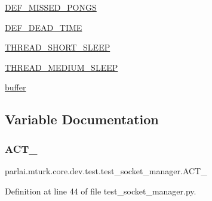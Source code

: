 \begin{DoxyCompactItemize}
\item 
\hyperlink{namespaceparlai_1_1mturk_1_1core_1_1dev_1_1test_1_1test__socket__manager_a581a61136610cac13da7eb93088bada4}{D\+E\+F\+\_\+\+M\+I\+S\+S\+E\+D\+\_\+\+P\+O\+N\+GS}
\item 
\hyperlink{namespaceparlai_1_1mturk_1_1core_1_1dev_1_1test_1_1test__socket__manager_a1f526f53b9ea429b7239abfe36761276}{D\+E\+F\+\_\+\+D\+E\+A\+D\+\_\+\+T\+I\+ME}
\item 
\hyperlink{namespaceparlai_1_1mturk_1_1core_1_1dev_1_1test_1_1test__socket__manager_ab474ca67f53fba2be6497594a4a0153e}{T\+H\+R\+E\+A\+D\+\_\+\+S\+H\+O\+R\+T\+\_\+\+S\+L\+E\+EP}
\item 
\hyperlink{namespaceparlai_1_1mturk_1_1core_1_1dev_1_1test_1_1test__socket__manager_afa35654edb0cffd647d87571a5de1264}{T\+H\+R\+E\+A\+D\+\_\+\+M\+E\+D\+I\+U\+M\+\_\+\+S\+L\+E\+EP}
\item 
\hyperlink{namespaceparlai_1_1mturk_1_1core_1_1dev_1_1test_1_1test__socket__manager_a32a19c42d26fb7242ba0cc3bc351efec}{buffer}
\end{DoxyCompactItemize}


\subsection{Variable Documentation}
\mbox{\label{namespaceparlai_1_1mturk_1_1core_1_1dev_1_1test_1_1test__socket__manager_a4bb06fcd05896bc65302255ed50b28ff}} 
\subsubsection{\texorpdfstring{A\+C\+T\+\_}{ACT\_1}}
{\footnotesize\ttfamily parlai.\+mturk.\+core.\+dev.\+test.\+test\+\_\+socket\+\_\+manager.\+A\+C\+T\+\_}



Definition at line 44 of file test\+\_\+socket\+\_\+manager.\+py.

\mbox{\label{namespaceparlai_1_1mturk_1_1core_1_1dev_1_1test_1_1test__socket__manager_acd55baeb2fe3eea43fe9eaa497013da9}} 
